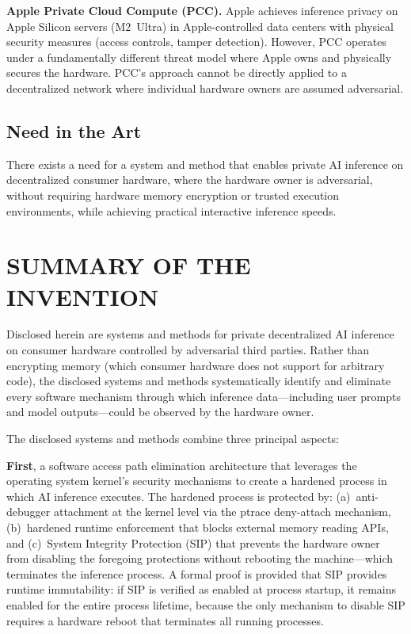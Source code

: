 \documentclass[11pt,letterpaper]{article}
\begin{document}
\textbf{Apple Private Cloud Compute (PCC).} Apple achieves inference privacy on Apple Silicon servers (M2~Ultra) in Apple-controlled data centers with physical security measures (access controls, tamper detection). However, PCC operates under a fundamentally different threat model where Apple owns and physically secures the hardware. PCC's approach cannot be directly applied to a decentralized network where individual hardware owners are assumed adversarial.

\subsection{Need in the Art}

There exists a need for a system and method that enables private AI inference on decentralized consumer hardware, where the hardware owner is adversarial, without requiring hardware memory encryption or trusted execution environments, while achieving practical interactive inference speeds.

\section{SUMMARY OF THE INVENTION}

Disclosed herein are systems and methods for private decentralized AI inference on consumer hardware controlled by adversarial third parties. Rather than encrypting memory (which consumer hardware does not support for arbitrary code), the disclosed systems and methods systematically identify and eliminate every software mechanism through which inference data---including user prompts and model outputs---could be observed by the hardware owner.

The disclosed systems and methods combine three principal aspects:

\textbf{First}, a software access path elimination architecture that leverages the operating system kernel's security mechanisms to create a hardened process in which AI inference executes. The hardened process is protected by: (a)~anti-debugger attachment at the kernel level via the ptrace deny-attach mechanism, (b)~hardened runtime enforcement that blocks external memory reading APIs, and (c)~System Integrity Protection (SIP) that prevents the hardware owner from disabling the foregoing protections without rebooting the machine---which terminates the inference process. A formal proof is provided that SIP provides runtime immutability: if SIP is verified as enabled at process startup, it remains enabled for the entire process lifetime, because the only mechanism to disable SIP requires a hardware reboot that terminates all running processes.
\end{document}
